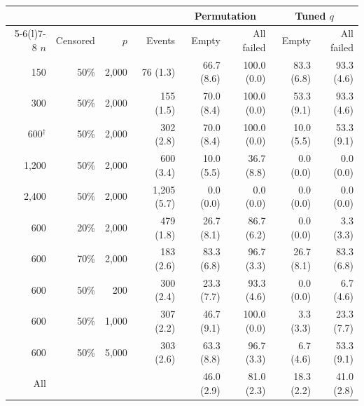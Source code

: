 \begin{tabular}{@{}rrr r rr rr@{}}
\toprule
 &  &  &  & \multicolumn{2}{c}{Permutation} & \multicolumn{2}{c}{Tuned $q$} \\
\cmidrule(lr){5-6}\cmidrule(l){7-8}
$n$ & Censored & $p$ & Events & Empty & All failed & Empty & All failed \\
\midrule
150 & 50\% & 2{,}000 & 76 (1.3) & 66.7 (8.6) & 100.0 (0.0) & 83.3 (6.8) & 93.3 (4.6) \\
300 & 50\% & 2{,}000 & 155 (1.5) & 70.0 (8.4) & 100.0 (0.0) & 53.3 (9.1) & 93.3 (4.6) \\
600$^{\dagger}$ & 50\% & 2{,}000 & 302 (2.8) & 70.0 (8.4) & 100.0 (0.0) & 10.0 (5.5) & 53.3 (9.1) \\
1{,}200 & 50\% & 2{,}000 & 600 (3.4) & 10.0 (5.5) & 36.7 (8.8) & 0.0 (0.0) & 0.0 (0.0) \\
2{,}400 & 50\% & 2{,}000 & 1{,}205 (5.7) & 0.0 (0.0) & 0.0 (0.0) & 0.0 (0.0) & 0.0 (0.0) \\
600 & 20\% & 2{,}000 & 479 (1.8) & 26.7 (8.1) & 86.7 (6.2) & 0.0 (0.0) & 3.3 (3.3) \\
600 & 70\% & 2{,}000 & 183 (2.6) & 83.3 (6.8) & 96.7 (3.3) & 26.7 (8.1) & 83.3 (6.8) \\
600 & 50\% & 200 & 300 (2.4) & 23.3 (7.7) & 93.3 (4.6) & 0.0 (0.0) & 6.7 (4.6) \\
600 & 50\% & 1{,}000 & 307 (2.2) & 46.7 (9.1) & 100.0 (0.0) & 3.3 (3.3) & 23.3 (7.7) \\
600 & 50\% & 5{,}000 & 303 (2.6) & 63.3 (8.8) & 96.7 (3.3) & 6.7 (4.6) & 53.3 (9.1) \\
\midrule
All &  &  &  & 46.0 (2.9) & 81.0 (2.3) & 18.3 (2.2) & 41.0 (2.8) \\
\bottomrule
\end{tabular}
